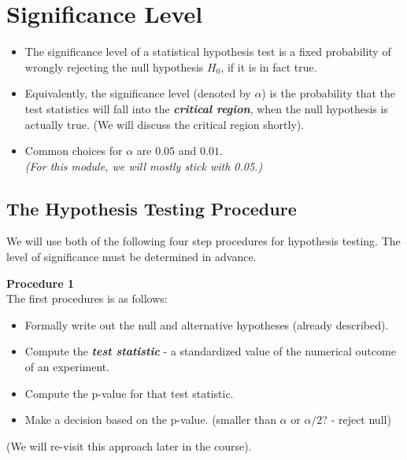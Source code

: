 \documentclass[]{report}
\begin{document}
{\section{Significance Level}

\begin{itemize}
\item The significance level of a statistical hypothesis test is a fixed probability of wrongly rejecting the null hypothesis $H_0$, if it is in fact true.

\item Equivalently, the significance level (denoted by $\alpha$) is the probability that the test statistics will fall into the \textbf{\emph{critical region}}, when the null hypothesis is actually true. (We will discuss the critical region shortly).

\item Common choices for $\alpha$ are $0.05$ and $0.01$.\\ \textit{(For this module, we will mostly stick with 0.05.)}
\end{itemize}


\subsection{The Hypothesis Testing Procedure }
We will use both of the following four step procedures for hypothesis testing. The level of significance must be determined in advance.

\textbf{Procedure 1}\\
The first procedures is as follows:

\begin{itemize}
\item Formally write out the null and alternative hypotheses (already described).
\item Compute the \emph{\textbf{test statistic}} - a standardized value of the numerical outcome of an experiment.
\item Compute the p-value for that test statistic.
\item Make a decision based on the p-value. (smaller than $\alpha$ or $\alpha/2$? - reject null)
\end{itemize}
(We will re-visit this approach later in the course).



}
\end{document}
